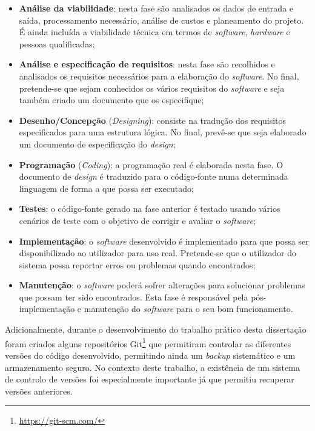 \begin{itemize}
	\item \textbf{Análise da viabilidade}: nesta fase são analisados os dados de entrada e saída, processamento necessário, análise de custos e planeamento do projeto. É ainda incluída a viabilidade técnica em termos de \textit{software}, \textit{hardware} e pessoas qualificadas;
	
	\item \textbf{Análise e especificação de requisitos}: nesta fase são recolhidos e analisados os requisitos necessários para a elaboração do \textit{software}. No final, pretende-se que sejam conhecidos os vários requisitos do \textit{software} e seja também criado um documento que os especifique; 
	
	\item  \textbf{Desenho/Concepção} (\textit{Designing}): consiste na tradução dos requisitos especificados para uma estrutura lógica. No final, prevê-se que seja elaborado um documento de especificação do \textit{design}; 
	
	
	\item  \textbf{Programação} (\textit{Coding}): a programação real é elaborada nesta fase. O documento de \textit{design} é traduzido para o código-fonte numa determinada linguagem de forma a que possa ser executado;
	
	\item \textbf{Testes}: o código-fonte gerado na fase anterior é testado usando vários cenários de teste com o objetivo de corrigir e avaliar o \textit{software}; 
	
	\item  \textbf{Implementação}: o \textit{software} desenvolvido é implementado para que possa ser disponibilizado ao utilizador para uso real. Pretende-se que o utilizador do sistema possa reportar erros ou problemas quando encontrados; 
	
	\item  \textbf{Manutenção}: o \textit{software} poderá sofrer alterações para solucionar problemas que possam ter sido encontrados. Esta fase é responsável pela pós-implementação e manutenção do \textit{software} para o seu bom funcionamento.
	
\end{itemize}


Adicionalmente, durante o desenvolvimento do trabalho prático desta dissertação foram criados alguns repositórios Git\footnote{\url{https://git-scm.com/}} que permitiram controlar as diferentes versões do código desenvolvido, permitindo ainda um \textit{backup} sistemático e um armazenamento seguro. No contexto deste trabalho, a existência de um sistema de controlo de versões foi especialmente importante já que permitiu recuperar versões anteriores. 








